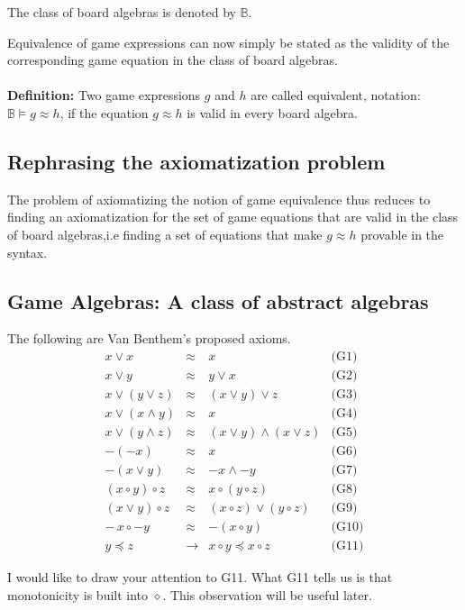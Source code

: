 \documentclass[12pt]{article}
\begin{document}
The class of board algebras is denoted by $\mathbb{B}$.

Equivalence of game expressions can now simply be stated as the validity of the corresponding game equation in the class of board algebras. \\ \\
\textbf{Definition:} Two game expressions $g$ and $h$ are called equivalent, notation: $\mathbb{B}\vDash g \approx h$, if the equation $g \approx h$ is valid in every board algebra.  
\subsection{Rephrasing the axiomatization problem}
The problem of axiomatizing the notion of game equivalence thus reduces to finding an axiomatization for the set of game equations that are valid in the class of board algebras,i.e finding a set of equations that make $g \approx h$ provable in the syntax. 
\subsection{Game Algebras: A class of abstract algebras}
\noindent The following are Van Benthem's proposed axioms. 
\[
\begin{array}{rcll}
x \lor x & \approx & x & \text{(G1)} \\[6pt]
x \lor y & \approx & y \lor x & \text{(G2)} \\[6pt]
x \lor (y \lor z) & \approx & (x \lor y) \lor z & \text{(G3)} \\[6pt]
x \lor (x \land y) & \approx & x & \text{(G4)} \\[6pt]
x \lor (y \land z) & \approx & (x \lor y) \land (x \lor z) & \text{(G5)} \\[6pt]
-(-x) & \approx & x & \text{(G6)} \\[6pt]
-(x \lor y) & \approx & -x \land -y & \text{(G7)} \\[6pt]
(x \circ y) \circ z & \approx & x \circ (y \circ z) & \text{(G8)} \\[6pt]
(x \lor y) \circ z & \approx & (x \circ z) \lor (y \circ z) & \text{(G9)} \\[6pt]
-\,x \circ -y & \approx & -(x \circ y) & \text{(G10)} \\[6pt]
y \preceq z & \to & x \circ y \preceq x \circ z & \text{(G11)} 
\end{array}
\]

\medskip
I would like to draw your attention to G11. What G11 tells us is that monotonicity is built into $\diamond$. This observation will be useful later. 
\end{document}
